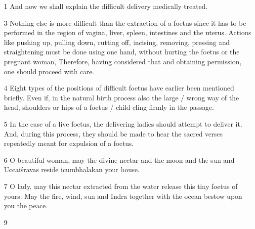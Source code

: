 \begin{translation}
    


    \item [1]  And now we shall explain the difficult delivery medically treated.
    
    \item [3]   Nothing else is more difficult than the extraction of a
foetus since it has to be performed in the region of vagina, liver,
spleen, intestines and the uterus.  Actions like pushing up, pulling
down, cutting off, incising, removing, pressing and straightening
must be done using one hand, without hurting the foetus or the
pregnant woman, Therefore, having considered that and obtaining
permission, one should proceed with care.
    
    \item [4]  Eight types of the positions of difficult
foetus have earlier been mentioned briefly. Even if, in the natural birth process
also the large / wrong way of the head, shoulders or hips of a foetus
/ child cling firmly in the passage.
    
    \item [5]  In the case of a live foetus, the delivering ladies should
attempt to deliver it. And, during this process, they should be made
to hear the sacred verses repeatedly meant for expulsion of a foetus.
  \begin{sloka}
        
    \item [6]  O beautiful woman, may the divine nectar and the moon
and the sun and Uccaiśravas reside icumbhalakan your house.
    
    \item [7]  O lady, may this nectar extracted from the water release
this tiny foetus of yours. May the fire, wind, sun and Indra together
with the ocean bestow upon you the peace.

  \end{sloka}


\item[9] 


\end{translation}

